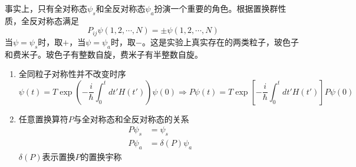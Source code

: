 \documentclass[12pt]{article}
\begin{document}
事实上，只有全对称态$\psi_s$和全反对称态$\psi_a$扮演一个重要的角色。根据置换群性质，全反对称态满足
\begin{equation*}
    P_{ij}\psi(1,2,\cdots,N)=\pm\psi(1,2,\cdots,N)
\end{equation*}
当$\psi=\psi_s$时，取$+$，当$\psi=\psi_a$时，取$-$。这是实验上真实存在的两类粒子，玻色子和费米子。玻色子有整数自旋，费米子有半整数自旋。
\begin{enumerate}
    \item 全同粒子对称性并不改变时序
    \begin{equation*}
        \psi(t)=T\exp(-\frac{i}{\hbar}\int_{0}^{t}dt'H(t'))\psi(0)\Rightarrow P\psi(t)=T\exp[-\frac{i}{\hbar}\int_{0}^{t}dt'H(t')]P\psi(0)
    \end{equation*}
    \item 任意置换算符$P$与全对称态和全反对称态的关系
    \begin{equation*}
        \begin{split}
            P\psi_s&=\psi_s\\
            P\psi_a&=\delta(P)\psi_a
        \end{split}
    \end{equation*}
    $\delta(P)$表示置换$P$的置换宇称
\end{enumerate}
\end{document}
